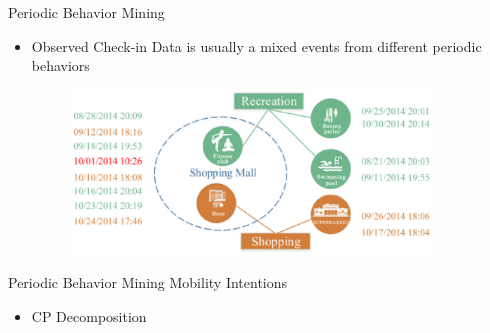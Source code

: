 \documentclass[
 size=14pt,
 paper=smartboard,  %
 mode=present, 		%
 display=slides, 	%
 style=tuliplab,  	%
 pauseslide,
 fleqn,leqno]{powerdot}
\begin{document}
\begin{slide}[toc=,bm=]{Periodic Behavior Mining}

\begin{itemize}
\item
Observed Check-in Data is usually a mixed events from different periodic behaviors

\vspace{1cm}

{
\begin{figure}[htbp]
    \centering
    \includegraphics[width=0.9\textwidth]{figures//theme1//Theme1_18.eps}
\end{figure}
}
\end{itemize}




\end{slide}

\begin{slide}[toc=,bm=]{Periodic Behavior Mining Mobility Intentions}

\begin{itemize}
\item
CP Decomposition

\end{itemize}

\end{slide}
\end{document}
